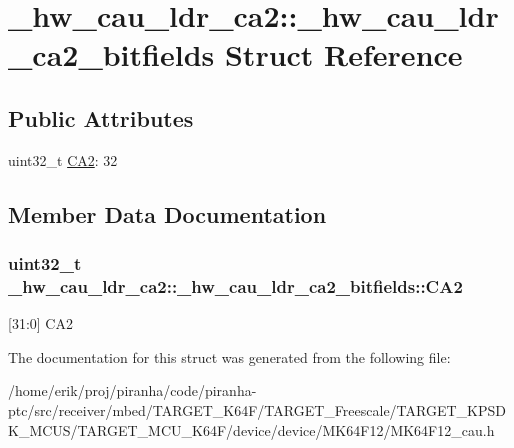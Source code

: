 \hypertarget{struct__hw__cau__ldr__ca2_1_1__hw__cau__ldr__ca2__bitfields}{}\section{\+\_\+hw\+\_\+cau\+\_\+ldr\+\_\+ca2\+:\+:\+\_\+hw\+\_\+cau\+\_\+ldr\+\_\+ca2\+\_\+bitfields Struct Reference}
\label{struct__hw__cau__ldr__ca2_1_1__hw__cau__ldr__ca2__bitfields}
\subsection*{Public Attributes}
\begin{DoxyCompactItemize}
\item 
uint32\+\_\+t \hyperlink{struct__hw__cau__ldr__ca2_1_1__hw__cau__ldr__ca2__bitfields_add22f76b0037e134fb7526321074620f}{C\+A2}\+: 32
\end{DoxyCompactItemize}


\subsection{Member Data Documentation}
\subsubsection[{\texorpdfstring{C\+A2}{CA2}}]{\setlength{\rightskip}{0pt plus 5cm}uint32\+\_\+t \+\_\+hw\+\_\+cau\+\_\+ldr\+\_\+ca2\+::\+\_\+hw\+\_\+cau\+\_\+ldr\+\_\+ca2\+\_\+bitfields\+::\+C\+A2}\hypertarget{struct__hw__cau__ldr__ca2_1_1__hw__cau__ldr__ca2__bitfields_add22f76b0037e134fb7526321074620f}{}\label{struct__hw__cau__ldr__ca2_1_1__hw__cau__ldr__ca2__bitfields_add22f76b0037e134fb7526321074620f}
\mbox{[}31\+:0\mbox{]} C\+A2 

The documentation for this struct was generated from the following file\+:\begin{DoxyCompactItemize}
\item 
/home/erik/proj/piranha/code/piranha-\/ptc/src/receiver/mbed/\+T\+A\+R\+G\+E\+T\+\_\+\+K64\+F/\+T\+A\+R\+G\+E\+T\+\_\+\+Freescale/\+T\+A\+R\+G\+E\+T\+\_\+\+K\+P\+S\+D\+K\+\_\+\+M\+C\+U\+S/\+T\+A\+R\+G\+E\+T\+\_\+\+M\+C\+U\+\_\+\+K64\+F/device/device/\+M\+K64\+F12/M\+K64\+F12\+\_\+cau.\+h\end{DoxyCompactItemize}
